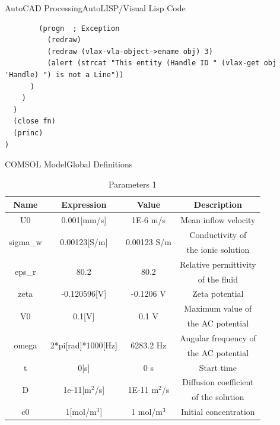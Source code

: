 \documentclass[10pt]{beamer}
\begin{document}
\begin{frame}[fragile]{AutoCAD Processing}{AutoLISP/Visual Lisp Code}
    \begin{verbatim}
        (progn  ; Exception
          (redraw)
          (redraw (vlax-vla-object->ename obj) 3)
          (alert (strcat "This entity (Handle ID " (vlax-get obj 'Handle) ") is not a Line"))
      )
    )
  )
  (close fn)
  (princ)
)
    \end{verbatim}
\end{frame}
\begin{frame}{COMSOL Model}{Global Definitions}
    \begin{table}
        \begin{tabular}{|c|c|c|c|}
            \hline
            Name&Expression&Value&Description\\
            \hline
            U0&0.001[mm/s]&1E-6 m/s&Mean inflow velocity\\
            \hline
            \multirow{2}{*}{sigma\_w}&\multirow{2}{*}{0.00123[S/m]}&\multirow{2}{*}{0.00123 S/m}&Conductivity of\\
            &&&the ionic solution\\
            \hline
            \multirow{2}{*}{eps\_r}&\multirow{2}{*}{80.2}&\multirow{2}{*}{80.2}&Relative permittivity\\
            &&&of the fluid\\
            \hline
            zeta&-0.120596[V]&-0.1206 V&Zeta potential\\
            \hline
            \multirow{2}{*}{V0}&\multirow{2}{*}{0.1[V]}&\multirow{2}{*}{0.1 V}&Maximum value of\\
            &&&the AC potential\\
            \hline
            \multirow{2}{*}{omega}&\multirow{2}{*}{2*pi[rad]*1000[Hz]}&\multirow{2}{*}{6283.2 Hz}&Angular frequency of\\
            &&&the AC potential\\
            \hline
            t&0[s]&0 s&Start time\\
            \hline
            \multirow{2}{*}{D}&\multirow{2}{*}{1e-11[m$^2$/s]}&\multirow{2}{*}{1E-11 m$^2$/s}&Diffusion coefficient\\
            &&&of the solution\\
            \hline
            c0&1[mol/m$^3$]&1 mol/m$^3$&Initial concentration\\
            \hline
        \end{tabular}
        \caption{Parameters 1}
    \end{table}
\end{frame}
\end{document}
